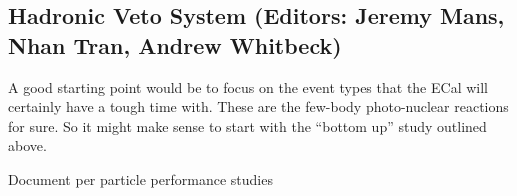 
\subsection{Hadronic Veto System (Editors: Jeremy Mans, Nhan Tran, Andrew Whitbeck)}

A good starting point would be to focus on the event types that the ECal will certainly have a tough time with. These are the few-body photo-nuclear reactions for sure. So it might make sense to start with the ``bottom up'' study outlined above. 

{\color{red} Document per particle performance studies }
